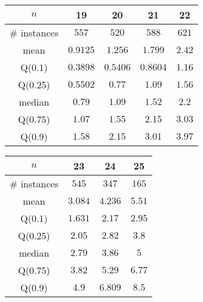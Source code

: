 \begin{tabular}{c|cccc} 
\hline 
$n$ & 19 & 20 & 21 & 22 \tabularnewline 
\hline 
\hline 
\# instances & $557$ & $520$ & $588$ & $621$ \tabularnewline 
mean & $0.9125$ & $1.256$ & $1.799$ & $2.42$ \tabularnewline 
Q(0.1) & $0.3898$ & $0.5406$ & $0.8604$ & $1.16$ \tabularnewline 
Q(0.25) & $0.5502$ & $0.77$ & $1.09$ & $1.56$ \tabularnewline 
median & $0.79$ & $1.09$ & $1.52$ & $2.2$ \tabularnewline 
Q(0.75) & $1.07$ & $1.55$ & $2.15$ & $3.03$ \tabularnewline 
Q(0.9) & $1.58$ & $2.15$ & $3.01$ & $3.97$ \tabularnewline 
\hline 
\end{tabular} 
\medskip{} 

\begin{tabular}{c|ccc} 
\hline 
$n$ & 23 & 24 & 25 \tabularnewline 
\hline 
\hline 
\# instances & $545$ & $347$ & $165$ \tabularnewline 
mean & $3.084$ & $4.236$ & $5.51$ \tabularnewline 
Q(0.1) & $1.631$ & $2.17$ & $2.95$ \tabularnewline 
Q(0.25) & $2.05$ & $2.82$ & $3.8$ \tabularnewline 
median & $2.79$ & $3.86$ & $5$ \tabularnewline 
Q(0.75) & $3.82$ & $5.29$ & $6.77$ \tabularnewline 
Q(0.9) & $4.9$ & $6.809$ & $8.5$ \tabularnewline 
\hline 
\end{tabular} 
\medskip{} 

